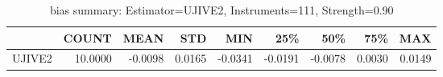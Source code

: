 \begin{table}[ht]
\centering
\caption{bias summary: Estimator=UJIVE2, Instruments=111, Strength=0.90}
\begin{tabular}{lrrrrrrrr}
\toprule
 & COUNT & MEAN & STD & MIN & 25\% & 50\% & 75\% & MAX \\
\midrule
UJIVE2 & 10.0000 & -0.0098 & 0.0165 & -0.0341 & -0.0191 & -0.0078 & 0.0030 & 0.0149 \\
\bottomrule
\end{tabular}
\end{table}
